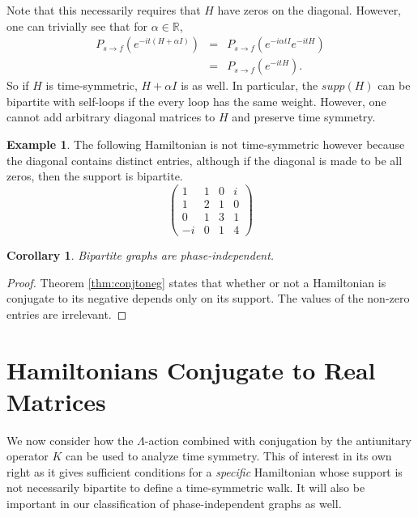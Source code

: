 \documentclass[twocolumn,superscriptaddress]{revtex4-1}
\theoremstyle{plain}
\newtheorem{corollary}[theorem]{Corollary}
\theoremstyle{definition}
\theoremstyle{definition}
\theoremstyle{definition}
\theoremstyle{definition}
\newtheorem{example}[theorem]{Example}
\theoremstyle{definition}
\theoremstyle{definition}
\begin{document}
Note that this necessarily requires that $H$ have zeros on the diagonal. However, one can trivially see that for $\alpha\in\mathbb{R}$, \begin{eqnarray}
P_{s\to f}(e^{-it(H+\alpha I)})&=&P_{s\to f}(e^{-i\alpha tI}e^{-itH})\\
&=&P_{s\to f}(e^{-itH}).\nonumber
\end{eqnarray}
 So if $H$ is time-symmetric, $H+\alpha I$ is as well. In particular, the $supp(H)$ can be bipartite with self-loops if the every loop has the same weight. However, one cannot add arbitrary diagonal matrices to $H$ and preserve time symmetry.
 
 \begin{example}\label{ex:disorder}
The following Hamiltonian is not time-symmetric however because the diagonal contains distinct entries, although if the diagonal is made to be all zeros, then the support is bipartite.
\begin{equation*}
 \begin{pmatrix}
  1&1&0&i\\
  1&2&1&0\\
  0&1&3&1\\
  -i&0&1&4
 \end{pmatrix}
\end{equation*}
\end{example}
 
 \begin{corollary}\label{cor:bipartitephaseind}
 Bipartite graphs are phase-independent.
\end{corollary}
\begin{proof}
 Theorem \ref{thm:conjtoneg} states that whether or not a Hamiltonian is conjugate to its negative depends only on its support. The values of the non-zero entries are irrelevant.
\end{proof}



 
\section{Hamiltonians Conjugate to Real Matrices}

We now consider how the $\Lambda$-action combined with conjugation by the antiunitary operator $K$ can be used to analyze time symmetry. This of interest in its own right as it gives sufficient conditions for a \emph{specific} Hamiltonian whose support is not necessarily bipartite to define a time-symmetric walk. It will also be important in our classification of phase-independent graphs as well.
\end{document}
